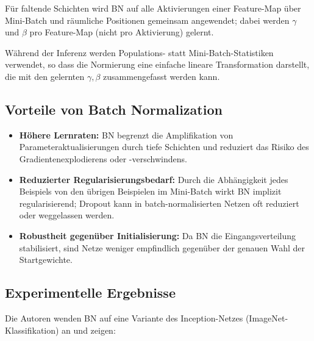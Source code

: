 \documentclass[a4paper,12pt]{article}
\begin{document}
F\"ur faltende Schichten wird BN auf alle Aktivierungen einer Feature-Map
\"uber Mini-Batch und r\"aumliche Positionen gemeinsam angewendet;
dabei werden $\gamma$ und $\beta$ pro Feature-Map (nicht pro Aktivierung) gelernt.

W\"ahrend der Inferenz werden Populations- statt Mini-Batch-Statistiken verwendet,
so dass die Normierung eine einfache lineare Transformation darstellt, die
mit den gelernten $\gamma, \beta$ zusammengefasst werden kann.

\subsection*{Vorteile von Batch Normalization}

\begin{itemize}
  \item \textbf{H\"ohere Lernraten:} BN begrenzt die Amplifikation von
    Parameteraktualisierungen durch tiefe Schichten und reduziert das Risiko
    des Gradientenexplodierens oder -verschwindens.

  \item \textbf{Reduzierter Regularisierungsbedarf:} Durch die Abh\"angigkeit
    jedes Beispiels von den \"ubrigen Beispielen im Mini-Batch wirkt BN
    implizit regularisierend; Dropout kann in batch-normalisierten Netzen
    oft reduziert oder weggelassen werden.

  \item \textbf{Robustheit gegen\"uber Initialisierung:} Da BN die
    Eingangsverteilung stabilisiert, sind Netze weniger empfindlich gegen\"uber
    der genauen Wahl der Startgewichte.
\end{itemize}

\subsection*{Experimentelle Ergebnisse}

Die Autoren wenden BN auf eine Variante des Inception-Netzes (ImageNet-Klassifikation)
an und zeigen:
\end{document}
